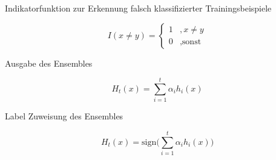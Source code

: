 \documentclass[a4paper,12pt]{scrartcl}
\begin{document}
\begin{equationfloat}[!h]
	\caption{Indikatorfunktion zur Erkennung falsch klassifizierter Trainingsbeispiele}
	\label{eq:indikator}
	\begin{equation}
		I(x \neq y) = \begin{cases} 1 &, x \neq y\\ 0 & ,\mbox{sonst} \end{cases}
	\end{equation}
\end{equationfloat}


\begin{equationfloat}[!h]
	\caption{Ausgabe des Ensembles}
	\label{eq:indikator}
	\begin{equation}
			H_t(x) =  \sum_{i=1}^t \alpha_i h_i(x) 
	\end{equation}
\end{equationfloat}

\begin{equationfloat}[!h]
	\caption{Label Zuweisung des Ensembles}
	\label{eq:indikator}
	\begin{equation}
		H_t(x) = \text{sign} \Big( \sum_{i=1}^t \alpha_i h_i(x) \Big)
	\end{equation}
\end{equationfloat}
\end{document}
